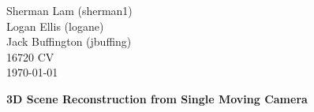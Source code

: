 \documentclass[11pt]{article}
\begin{document}
\begin{flushleft}
Sherman Lam (sherman1) \\
Logan Ellis (logane) \\
Jack Buffington (jbuffing)  \\
16720 CV\\
\today
\end{flushleft}



\begin{center}
\begin{Large}
\textbf{3D Scene Reconstruction from Single Moving Camera}
\end{Large}
\end{center}




%



\clearpage


\end{document}

